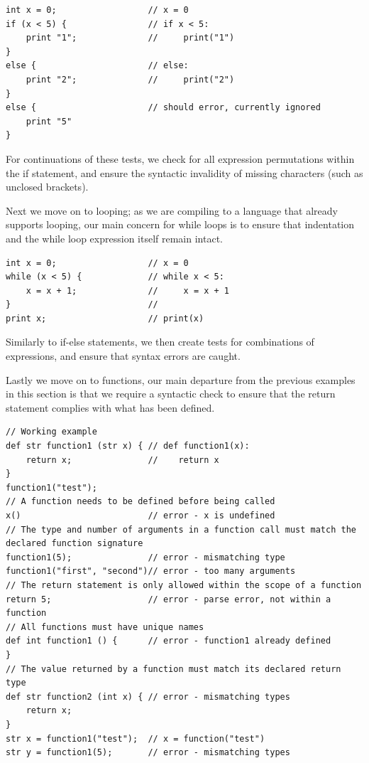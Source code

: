 \begin{lstlisting}[caption={Testing if-else statements},captionpos=b, label={lst:lattice-if-else-test}]
int x = 0;                  // x = 0
if (x < 5) {                // if x < 5:
    print "1";              //     print("1")
}
else {                      // else:
    print "2";              //     print("2")
}
else {                      // should error, currently ignored
    print "5"
}
\end{lstlisting}

For continuations of these tests, we check for all expression permutations within the if statement, and ensure the
syntactic invalidity of missing characters (such as unclosed brackets).

Next we move on to looping; as we are compiling to a language that already supports looping, our main concern for while
loops is to ensure that indentation and the while loop expression itself remain intact.

\begin{lstlisting}[caption={Testing while loops},captionpos=b, label={lst:lattice-while-loop-test}]
int x = 0;                  // x = 0
while (x < 5) {             // while x < 5:
    x = x + 1;              //     x = x + 1
}                           //
print x;                    // print(x)
\end{lstlisting}

Similarly to if-else statements, we then create tests for combinations of expressions, and ensure that syntax errors
are caught.

Lastly we move on to functions, our main departure from the previous examples in this section is that we require a
syntactic check to ensure that the return statement complies with what has been defined.

\begin{lstlisting}[caption={Testing functions},captionpos=b, label={lst:lattice-function-test}]
// Working example
def str function1 (str x) { // def function1(x):
    return x;               //    return x
}
function1("test");
// A function needs to be defined before being called
x()                         // error - x is undefined
// The type and number of arguments in a function call must match the declared function signature
function1(5);               // error - mismatching type
function1("first", "second")// error - too many arguments
// The return statement is only allowed within the scope of a function
return 5;                   // error - parse error, not within a function
// All functions must have unique names
def int function1 () {      // error - function1 already defined
}
// The value returned by a function must match its declared return type
def str function2 (int x) { // error - mismatching types
    return x;
}
str x = function1("test");  // x = function("test")
str y = function1(5);       // error - mismatching types
\end{lstlisting}

